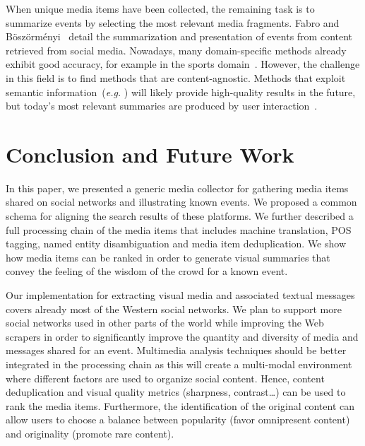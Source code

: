 \documentclass{acm_proc_article-sp}
\let\oldemph\emph
\renewcommand{\emph}[1]{\oldemph{\fontsize{9}{9}\selectfont #1}}
\begin{document}
When unique media items have been collected, the remaining task is to summarize events by selecting the most relevant media fragments. Fabro and B\"osz\"orm\'enyi~\cite{Fabro:MMM12} detail the summarization and presentation of events from content retrieved from social media. Nowadays, many domain-specific methods already exhibit good accuracy, for example in the sports domain~\cite{Li1,Li2}. However, the challenge in this field is to find methods that are content-agnostic. Methods that exploit semantic information~(\emph{e.g.} \cite{Chen}) will likely provide high-quality results in the future, but today's most relevant summaries are produced by user interaction~\cite{Olsen}.


\section{Conclusion and Future Work}                                        \label{sec:conclusion}
In this paper, we presented a generic media collector for gathering media items shared on social networks and illustrating known events. We proposed a common schema for aligning the search results of these platforms. We further described a full processing chain of the media items that includes machine translation, POS tagging, named entity disambiguation and media item deduplication. We show how media items can be ranked in order to generate visual summaries that convey the feeling of the wisdom of the crowd for a known event.

Our implementation for extracting visual media and associated textual messages covers already most of the Western social networks. We plan to support more social networks used in other parts of the world while improving the Web scrapers in order to significantly improve the quantity and diversity of media and messages shared for an event. Multimedia analysis techniques should be better integrated in the processing chain as this will create a multi-modal environment where different factors are used to organize social content. Hence, content deduplication and visual quality metrics (sharpness, contrast\ldots) can be used to rank the media items. Furthermore, the identification of the original content can allow users to choose a balance between popularity (favor omnipresent content) and originality (promote rare content).
\end{document}

